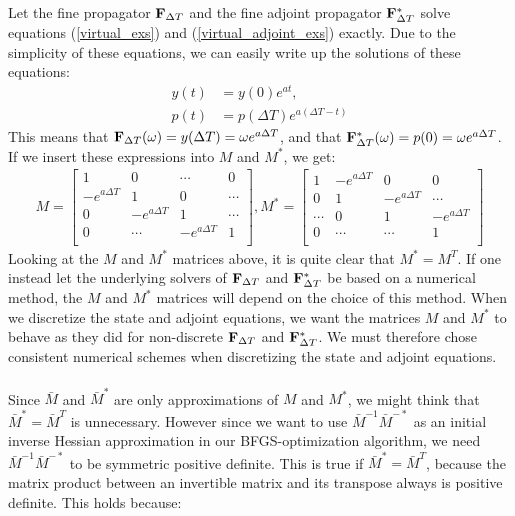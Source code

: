 \\
\\
Let the fine propagator $\bold F_{\Delta T}$ and the fine adjoint propagator $\bold F_{\Delta T}^*$ solve equations (\ref{virtual_exs}) and (\ref{virtual_adjoint_exs}) exactly. Due to the simplicity of these equations, we can easily write up the solutions of these equations:
\begin{align}
y(t)&=y(0)e^{at}, \\
p(t)&=p(\Delta T) e^{a(\Delta T-t)}
\end{align} 
This means that $\bold F_{\Delta T}(\omega)=y(\Delta T)=\omega e^{a\Delta T}$, and that $\bold F_{\Delta T}^*(\omega)=p(0)=\omega e^{a\Delta T}$. If we insert these expressions into $M$ and $M^*$, we get:
\begin{align*}
M = \left[ \begin{array}{cccc}
   1 & 0 & \cdots & 0 \\  
   -e^{a\Delta T} & 1 & 0 & \cdots \\ 
   0 &-e^{a\Delta T} & 1  & \cdots \\
   0 &\cdots &-e^{a\Delta T} & 1  \\
   \end{array}  \right],
M^* =\left[ \begin{array}{cccc}
   	 1& - e^{a\Delta T} & 0 & 0 \\  
  	 0 & 1 & - e^{a\Delta T} & \cdots \\ 
  	 \cdots &0 &  1 & - e^{a\Delta T} \\
  	 0 &\cdots &\cdots &  1  \\
  	 \end{array}  \right]
\end{align*}
Looking at the $M$ and $M^*$ matrices above, it is quite clear that $M^*=M^T$. If one instead let the underlying solvers of $\bold F_{\Delta T}$ and $\bold F_{\Delta T}^*$ be based on a numerical method, the $M$ and $M^*$ matrices will depend on the choice of this method. When we discretize the state and adjoint equations, we want the matrices $M$ and $M^*$ to behave as they did for non-discrete $\bold F_{\Delta T}$ and $\bold F_{\Delta T}^*$. We must therefore chose consistent numerical schemes when discretizing the state and adjoint equations. 
\\
\\
Since $\bar{M}$ and $\bar{M}^{*}$ are only approximations of $M$ and $M^*$, we might think that $\bar{M}^*=\bar{M}^T$ is unnecessary. However since we want to use $\bar{M}^{-1}\bar{M}^{-*}$ as an initial inverse Hessian approximation in our BFGS-optimization algorithm, we need $\bar{M}^{-1}\bar{M}^{-*}$ to be symmetric positive definite. This is true if $\bar{M}^*=\bar{M}^T$, because the matrix product between an invertible matrix and its transpose always is positive definite. This holds because:
